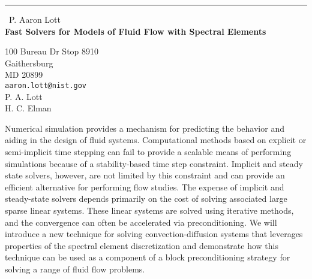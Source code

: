 \documentclass{report}
\begin{document}
\begin{center}
\rule{6in}{1pt} \
{\large P. Aaron Lott \\
{\bf Fast Solvers for Models of Fluid Flow with Spectral Elements}}

100 Bureau Dr Stop 8910 \\ Gaithersburg \\ MD 20899
\\
{\tt aaron.lott@nist.gov}\\
P. A.  Lott\\
H. C. Elman\end{center}

Numerical simulation provides a mechanism for predicting the behavior and
aiding in the design of fluid systems. Computational methods based on
explicit or semi-implicit time stepping can fail to provide a scalable
means of performing simulations because of a stability-based time step
constraint. Implicit and steady state solvers, however, are not limited
by this constraint and can provide an efficient alternative for
performing flow studies. The expense of implicit and steady-state solvers
depends primarily on the cost of solving associated large sparse linear
systems. These linear systems are solved using iterative methods, and the
convergence can often be accelerated via preconditioning. We will
introduce a new technique for solving convection-diffusion systems that
leverages properties of the spectral element discretization and
demonstrate how this technique can be used as a component of a block
preconditioning strategy for solving a range of fluid flow problems.
\end{document}
